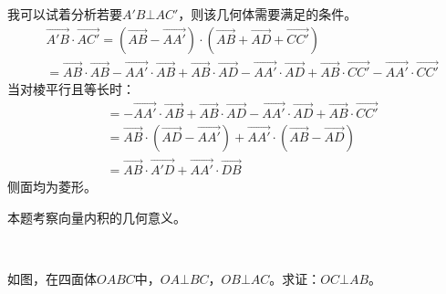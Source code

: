 我可以试着分析若要$A'B\bot AC'$，则该几何体需要满足的条件。
\begin{align*}
&\overrightarrow{A'B}\cdot \overrightarrow{AC'}=\left( \overrightarrow{AB}-\overrightarrow{AA'} \right) \cdot \left( \overrightarrow{AB}+\overrightarrow{AD}+\overrightarrow{CC'} \right) \\
&=\overrightarrow{AB}\cdot \overrightarrow{AB}-\overrightarrow{AA'}\cdot \overrightarrow{AB}+\overrightarrow{AB}\cdot \overrightarrow{AD}-\overrightarrow{AA'}\cdot \overrightarrow{AD}+\overrightarrow{AB}\cdot \overrightarrow{CC'}-\overrightarrow{AA'}\cdot \overrightarrow{CC'}
\end{align*}
当对棱平行且等长时：
\begin{align*}
&=-\overrightarrow{AA'}\cdot \overrightarrow{AB}+\overrightarrow{AB}\cdot \overrightarrow{AD}-\overrightarrow{AA'}\cdot \overrightarrow{AD}+\overrightarrow{AB}\cdot \overrightarrow{CC'} \\
&=\overrightarrow{AB}\cdot \left( \overrightarrow{AD}-\overrightarrow{AA'} \right) +\overrightarrow{AA'}\cdot \left( \overrightarrow{AB}-\overrightarrow{AD} \right) \\
&=\overrightarrow{AB}\cdot \overrightarrow{A'D}+\overrightarrow{AA'}\cdot \overrightarrow{DB}
\end{align*}
侧面均为菱形。

\begin{tcolorbox}
本题考察向量内积的几何意义。
\end{tcolorbox}

~

\begin{example}
如图，在四面体$OABC$中，$OA\bot BC$，$OB\bot AC$。求证：$OC\bot AB$。
\end{example}

\begin{figure}[h]
\centering
{}
\end{figure}

